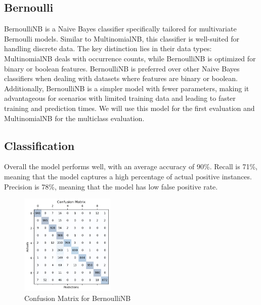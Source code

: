 \documentclass{article}
\begin{document}
\begin{titlepage}
  \section{Bernoulli} 
  BernoulliNB is a Naive Bayes classifier specifically tailored for multivariate Bernoulli models. Similar to MultinomialNB, this classifier is well-suited for handling discrete data.
  \newline
  \newline
  The key distinction lies in their data types:
  MultinomialNB deals with occurrence counts, while BernoulliNB is optimized for binary or boolean features.
  BernoulliNB is preferred over other Naive Bayes classifiers when dealing with datasets where features are binary or boolean.
  \newline
  \newline
  Additionally, BernoulliNB is a simpler model with fewer parameters, making it advantageous for scenarios with limited training data and leading to faster training and prediction times.
  We will use this model for the first evaluation and MultinomialNB for the multiclass evaluation.
  \subsection{Classification}
  Overall the model performs well, with an average accuracy of 90\%.
  \newline
  \newline
  Recall is 71\%, meaning that the model captures a high percentage of actual positive instances.
  \newline
  \newline
  Precision is 78\%, meaning that the model has low false positive rate.
  \begin{figure}[htbp]
    \centering
    \includegraphics[width=0.4\textwidth]{bernoulliCM.png}
    \caption{Confusion Matrix for BernoulliNB}
    \label{fig:sample}
  \end{figure}


\end{titlepage}
\end{document}
